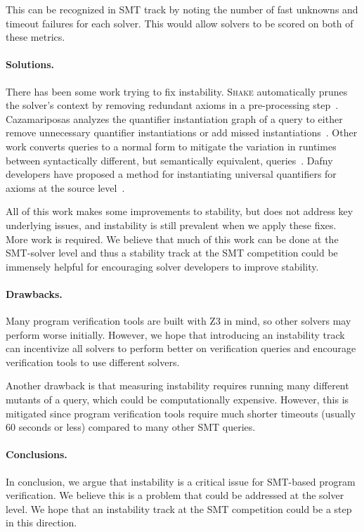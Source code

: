 \documentclass[
]{ceurart}
\newcommand{\shake}{\textsc{Shake}\xspace}
\newcommand{\caza}{Cazamariposas\xspace}
\begin{document}
\begin{itemize}
This can be recognized in SMT track by noting the number of fast unknowns and
timeout failures for each solver. This would allow solvers to be scored on both
of these metrics.


\end{itemize}

\paragraph{Solutions.} There has been some work trying to fix instability.
\shake automatically prunes the solver's context by removing redundant axioms in
a pre-processing step~\cite{shake}. \caza analyzes the quantifier instantiation
graph of a query to either remove unnecessary quantifier instantiations or add missed instantiations~\cite{cazamariposas}.
Other work converts queries to a normal form to mitigate the variation in
runtimes between syntactically different, but semantically equivalent,
queries~\cite{normalize}. Dafny developers have proposed a method for instantiating universal
quantifiers for axioms at the source level~\cite{free-facts}.

All of this work makes some improvements to stability, but does not address key
underlying issues, and instability is still prevalent when we apply these fixes.
More work is required. We believe that much of this work can be done at the SMT-solver level and thus a stability track at the SMT competition could be
immensely helpful for encouraging solver developers to improve stability.

\paragraph{Drawbacks.} Many program verification tools are built with Z3 in
mind, so other solvers may perform worse initially. However, we hope that
introducing an instability track can incentivize all solvers to perform
better on verification queries and encourage verification tools to use different
solvers.

Another drawback is that measuring instability requires running many different
mutants of a query, which could be computationally expensive. However, this is
mitigated since program verification tools require much shorter timeouts
(usually 60 seconds or less) compared to many other SMT queries.

\paragraph{Conclusions.} In conclusion, we argue that instability is a critical
issue for SMT-based program verification. We believe this is a problem that
could be addressed at the solver level. We hope that an instability track at the
SMT competition could be a step in this direction.
\end{document}
